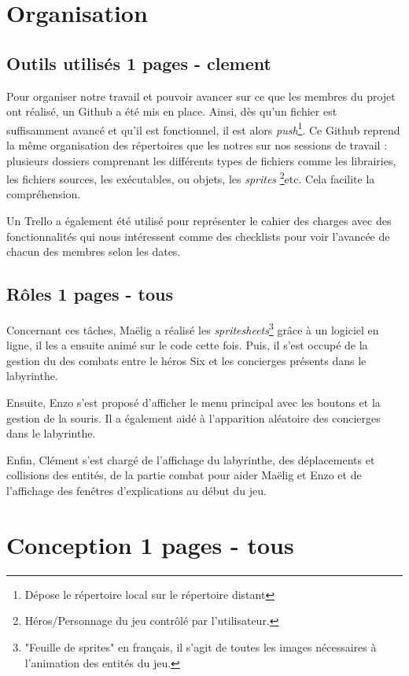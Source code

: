 \documentclass[10pt]{article}
\begin{document}
\section{Organisation}   
   \subsection{Outils utilisés 1 pages - clement}
   Pour organiser notre travail et pouvoir avancer sur ce que les membres du projet ont réalisé, un Github a été mis en place. Ainsi, dès qu'un fichier est
   suffisamment avancé et qu'il est fonctionnel, il est alors \textit{push}\footnote{Dépose le répertoire local sur le répertoire distant}.
   Ce Github reprend la même organisation des répertoires que les notres sur nos sessions de travail : plusieurs dossiers comprenant les différents types 
   de fichiers comme les librairies, les fichiers sources, les exécutables, ou objets, les \textit{sprites}
   \footnote{Héros/Personnage du jeu contrôlé par l'utilisateur.}etc. Cela facilite la compréhension.

   Un Trello a également été utilisé pour représenter le cahier des charges avec des 
   fonctionnalités qui nous intéressent comme des checklists pour voir l'avancée de chacun des membres selon les dates.
   \subsection{Rôles 1 pages - tous}
   Concernant ces tâches, Maëlig a réalisé les \textit{spritesheets}\footnote{"Feuille de sprites" en français, il s'agit de toutes les images nécessaires
   à l'animation des entités du jeu.} grâce à un logiciel en ligne, il les a ensuite animé sur le code cette fois. Puis, il s'est occupé de la gestion du 
   des combats entre le héros Six et les concierges présents dans le labyrinthe.

   Ensuite, Enzo s'est proposé d'afficher le menu principal avec les boutons et la gestion de la souris. Il a également aidé à l'apparition aléatoire des 
   concierges dans le labyrinthe. 
   
   Enfin, Clément s'est chargé de l'affichage du labyrinthe, des déplacements et collisions des entités, de la partie combat pour aider Maëlig et Enzo
   et de l'affichage des fenêtres d'explications au début du jeu.
   \clearpage
\section{Conception 1 pages - tous}
\end{document}
